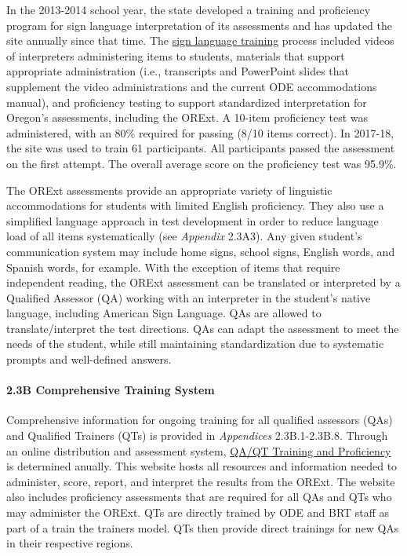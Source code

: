 \documentclass[]{article}
\let\oldparagraph\paragraph
\renewcommand{\paragraph}[1]{\oldparagraph{#1}\mbox{}}
\begin{document}
In the 2013-2014 school year, the state developed a training and
proficiency program for sign language interpretation of its assessments
and has updated the site annually since that time. The
\color{link}\href{http://lms.brtprojects.org}{sign language training}
\color{black} process included videos of interpreters administering
items to students, materials that support appropriate administration
(i.e., transcripts and PowerPoint slides that supplement the video
administrations and the current ODE accommodations manual), and
proficiency testing to support standardized interpretation for Oregon's
assessments, including the ORExt. A 10-item proficiency test was
administered, with an 80\% required for passing (8/10 items correct). In
2017-18, the site was used to train 61 participants. All participants
passed the assessment on the first attempt. The overall average score on
the proficiency test was 95.9\%.

The ORExt assessments provide an appropriate variety of linguistic
accommodations for students with limited English proficiency. They also
use a simplified language approach in test development in order to
reduce language load of all items systematically (see \emph{Appendix}
2.3A3). Any given student's communication system may include home signs,
school signs, English words, and Spanish words, for example. With the
exception of items that require independent reading, the ORExt
assessment can be translated or interpreted by a Qualified Assessor (QA)
working with an interpreter in the student's native language, including
American Sign Language. QAs are allowed to translate/interpret the test
directions. QAs can adapt the assessment to meet the needs of the
student, while still maintaining standardization due to systematic
prompts and well-defined answers.

\paragraph{2.3B Comprehensive Training
System}\label{b-comprehensive-training-system}

Comprehensive information for ongoing training for all qualified
assessors (QAs) and Qualified Trainers (QTs) is provided in
\emph{Appendices} 2.3B.1-2.3B.8. Through an online distribution and
assessment system, \color{link}\href{https://or.k12test.com/}{QA/QT
Training and Proficiency} \color{black} is determined anually. This
website hosts all resources and information needed to administer, score,
report, and interpret the results from the ORExt. The website also
includes proficiency assessments that are required for all QAs and QTs
who may administer the ORExt. QTs are directly trained by ODE and BRT
staff as part of a train the trainers model. QTs then provide direct
trainings for new QAs in their respective regions.
\end{document}
